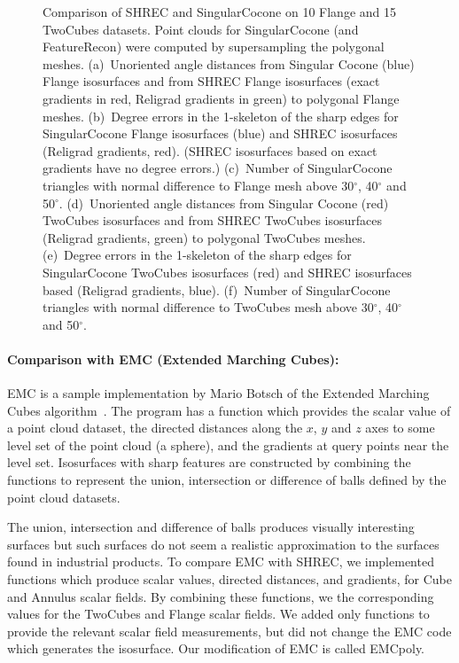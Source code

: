 \begin{figure}[t]
		
\caption{Comparison of SHREC and SingularCocone on 10 Flange and 15 TwoCubes datasets.
Point clouds for SingularCocone (and FeatureRecon) were computed
by supersampling the polygonal meshes.
(a)~Unoriented angle distances from Singular Cocone (blue) Flange isosurfaces
and from SHREC Flange isosurfaces (exact gradients in red,
Religrad gradients in green) to polygonal Flange meshes.
(b)~Degree errors in the 1-skeleton of the sharp edges
for SingularCocone Flange isosurfaces (blue)
and SHREC isosurfaces (Religrad gradients, red).
(SHREC isosurfaces based on exact gradients have no degree errors.)
(c)~Number of SingularCocone triangles 
with normal difference to Flange mesh
above 30$^\circ$, 40$^\circ$ and 50$^\circ$.
(d)~Unoriented angle distances from Singular Cocone (red) TwoCubes isosurfaces
and from SHREC TwoCubes isosurfaces (Religrad gradients, green) 
to polygonal TwoCubes meshes.
(e)~Degree errors in the 1-skeleton of the sharp edges
for SingularCocone TwoCubes isosurfaces (red)
and SHREC isosurfaces based (Religrad gradients, blue).
(f)~Number of SingularCocone triangles 
with normal difference to TwoCubes mesh
above 30$^\circ$, 40$^\circ$ and 50$^\circ$.
}
\label{fig:cocone:compare}

\end{figure}


\paragraph{Comparison with EMC (Extended Marching Cubes):}

EMC is a sample implementation by Mario Botsch
of the Extended Marching Cubes algorithm~\cite{kbsh-fssev-01}.
The program has a function which provides the scalar value of a point cloud dataset,
the directed distances along the $x$, $y$ and $z$ axes to some level set of the point cloud (a sphere),
and the gradients at query points near the level set.
Isosurfaces with sharp features are constructed by combining the functions
to represent the union, intersection or difference of balls 
defined by the point cloud datasets.

The union, intersection and difference of balls produces visually interesting surfaces
but such surfaces do not seem a realistic approximation to the surfaces found in industrial products.
To compare EMC with SHREC, we implemented functions which produce scalar values, directed distances,
and gradients, for Cube and Annulus scalar fields.
By combining these functions,
we the corresponding values for the TwoCubes and Flange scalar fields.
We added only functions to provide the relevant scalar field measurements,
but did not change the EMC code which generates the isosurface.
Our modification of EMC is called EMCpoly.

